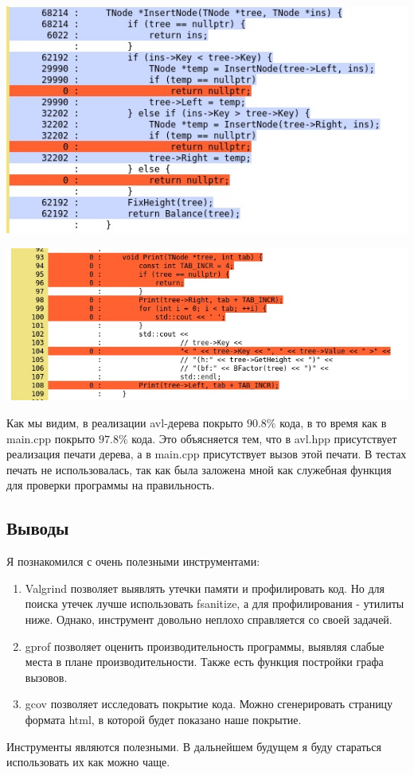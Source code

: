 \documentclass[12pt]{article}
\begin{document}
	\begin{center}
		\includegraphics[width=\linewidth]{gcov3.jpg}
	\end{center}
	\begin{center}
		\includegraphics[width=\linewidth]{gcov4.jpg}
	\end{center}

	Как мы видим, в реализации avl-дерева покрыто $90.8\%$ кода, в то время как в main.cpp покрыто $97.8\%$ кода. Это объясняется тем, что в avl.hpp присутствует реализация печати дерева, а в main.cpp присутствует вызов этой печати. В тестах печать не использовалась, так как была заложена мной как служебная функция для проверки программы на правильность.
	
	 
	
	\subsection*{Выводы}
	
	Я познакомился с очень полезными инструментами:
	\begin{enumerate}
		\item Valgrind позволяет выявлять утечки памяти и профилировать код. Но для поиска утечек лучше использовать fsanitize, а для профилирования - утилиты ниже. Однако, инструмент довольно неплохо справляется со своей задачей.
		\item gprof позволяет оценить производительность программы, выявляя слабые места в плане производительности. Также есть функция постройки графа вызовов.
		\item gcov позволяет исследовать покрытие кода. Можно сгенерировать страницу формата html, в которой будет показано наше покрытие.
	\end{enumerate}
	Инструменты являются полезными. В дальнейшем будущем я буду стараться использовать их как можно чаще.
\end{document}
